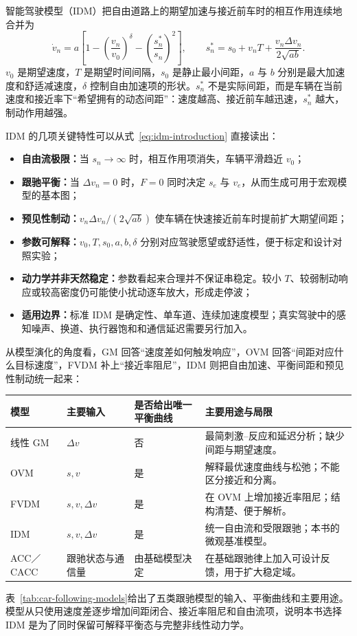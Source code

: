 \documentclass[11pt,a4paper,openany]{book}
\numberwithin{equation}{chapter}
\numberwithin{figure}{chapter}
\numberwithin{table}{chapter}
\newcommand{\tabletext}[2]{%
  \par\smallskip\noindent
  表~\ref{#1}给出了#2
  \par\smallskip
}
\begin{document}
智能驾驶模型（IDM）把自由道路上的期望加速与接近前车时的相互作用连续地合并为\cite{treiber2000}
\begin{equation}
\dot v_n
=a\left[
1-\left(\frac{v_n}{v_0}\right)^\delta
-\left(\frac{s_n^*}{s_n}\right)^2
\right],
\qquad
s_n^*=s_0+v_nT+
\frac{v_n\Delta v_n}{2\sqrt{ab}}.
\label{eq:idm-introduction}
\end{equation}
$v_0$ 是期望速度，$T$ 是期望时间间隔，$s_0$ 是静止最小间距，$a$ 与 $b$ 分别是最大加速度和舒适减速度，$\delta$ 控制自由加速项的形状。$s_n^*$ 不是实际间距，而是车辆在当前速度和接近率下“希望拥有的动态间距”：速度越高、接近前车越迅速，$s_n^*$ 越大，制动作用越强。

IDM 的几项关键特性可以从式~\eqref{eq:idm-introduction} 直接读出：
\begin{itemize}[leftmargin=1.5em,itemsep=3pt]
\item \textbf{自由流极限：}当 $s_n\to\infty$ 时，相互作用项消失，车辆平滑趋近 $v_0$；
\item \textbf{跟驰平衡：}当 $\Delta v_n=0$ 时，$F=0$ 同时决定 $s_e$ 与 $v_e$，从而生成可用于宏观模型的基本图；
\item \textbf{预见性制动：}$v_n\Delta v_n/(2\sqrt{ab})$ 使车辆在快速接近前车时提前扩大期望间距；
\item \textbf{参数可解释：}$v_0,T,s_0,a,b,\delta$ 分别对应驾驶愿望或舒适性，便于标定和设计对照实验；
\item \textbf{动力学并非天然稳定：}参数看起来合理并不保证串稳定。较小 $T$、较弱制动响应或较高密度仍可能使小扰动逐车放大，形成走停波；
\item \textbf{适用边界：}标准 IDM 是确定性、单车道、连续加速度模型；真实驾驶中的感知噪声、换道、执行器饱和和通信延迟需要另行加入。
\end{itemize}

从模型演化的角度看，GM 回答“速度差如何触发响应”，OVM 回答“间距对应什么目标速度”，FVDM 补上“接近率阻尼”，IDM 则把自由加速、平衡间距和预见性制动统一起来：
\begin{center}
\small
{}
\label{tab:car-following-models}
\begin{tabular}{p{2.1cm}p{3.3cm}p{3.6cm}p{4.8cm}}
\toprule
模型 & 主要输入 & 是否给出唯一平衡曲线 & 主要用途与局限 \\
\midrule
线性 GM & $\Delta v$ & 否 & 最简刺激--反应和延迟分析；缺少间距与期望速度。\\
OVM & $s,v$ & 是 & 解释最优速度曲线与松弛；不能区分接近和分离。\\
FVDM & $s,v,\Delta v$ & 是 & 在 OVM 上增加接近率阻尼；结构清楚、便于解析。\\
IDM & $s,v,\Delta v$ & 是 & 统一自由流和受限跟驰；本书的微观基准模型。\\
ACC／CACC & 跟驰状态与通信量 & 由基础模型决定 & 在基础跟驰律上加入可设计反馈，用于扩大稳定域。\\
\bottomrule
\end{tabular}
\end{center}
\tabletext{tab:car-following-models}{五类跟驰模型的输入、平衡曲线和主要用途。模型从只使用速度差逐步增加间距闭合、接近率阻尼和自由流项，说明本书选择 IDM 是为了同时保留可解释平衡态与完整非线性动力学。}
\end{document}
